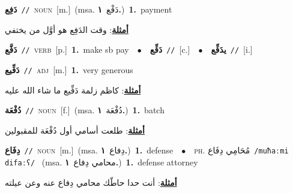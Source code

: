 \documentclass[10pt,a4paper,twoside]{article} %
\begin{document}
\begin{multicols}{2}
{\setlength\topsep{0pt}\textbf{\foreignlanguage{arabic}{دَفِع}}\ {\color{gray}\texttt{//}\color{black}}\ \textsc{noun}\ [m.]\ \color{gray}(msa. \foreignlanguage{arabic}{دَفْع}~\foreignlanguage{arabic}{\textbf{١.}})\color{black}\ \textbf{1.}~payment\  \begin{flushright}\color{gray}\foreignlanguage{arabic}{\textbf{\underline{\foreignlanguage{arabic}{أمثلة}}}: وقت الدَفِع هو أوَّل من يختفي}\end{flushright}\color{black}} \vspace{2mm}

{\setlength\topsep{0pt}\textbf{\foreignlanguage{arabic}{دَفَّع}}\ {\color{gray}\texttt{//}\color{black}}\ \textsc{verb}\ [p.]\ \textbf{1.}~make sb pay\ \ $\bullet$\ \ \setlength\topsep{0pt}\textbf{\foreignlanguage{arabic}{دَفِّع}}\ {\color{gray}\texttt{//}\color{black}}\ [c.]\ \ $\bullet$\ \ \setlength\topsep{0pt}\textbf{\foreignlanguage{arabic}{يدَفِّع}}\ {\color{gray}\texttt{//}\color{black}}\ [i.]\ } \vspace{2mm}

{\setlength\topsep{0pt}\textbf{\foreignlanguage{arabic}{دَفِّيع}}\ {\color{gray}\texttt{//}\color{black}}\ \textsc{adj}\ [m.]\ \textbf{1.}~very generous\  \begin{flushright}\color{gray}\foreignlanguage{arabic}{\textbf{\underline{\foreignlanguage{arabic}{أمثلة}}}: كاظم زلمة دَفِّيع ما شاء الله عليه}\end{flushright}\color{black}} \vspace{2mm}

{\setlength\topsep{0pt}\textbf{\foreignlanguage{arabic}{دُفْعَة}}\ {\color{gray}\texttt{//}\color{black}}\ \textsc{noun}\ [f.]\ \color{gray}(msa. \foreignlanguage{arabic}{دُفْعَة}~\foreignlanguage{arabic}{\textbf{١.}})\color{black}\ \textbf{1.}~batch\  \begin{flushright}\color{gray}\foreignlanguage{arabic}{\textbf{\underline{\foreignlanguage{arabic}{أمثلة}}}: طلعت أسامي أول دُفْعَة للمقبولين}\end{flushright}\color{black}} \vspace{2mm}

{\setlength\topsep{0pt}\textbf{\foreignlanguage{arabic}{دِفَاع}}\ {\color{gray}\texttt{//}\color{black}}\ \textsc{noun}\ [m.]\ \color{gray}(msa. \foreignlanguage{arabic}{دِفاع}~\foreignlanguage{arabic}{\textbf{١.}})\color{black}\ \textbf{1.}~defense\ \ $\bullet$\ \ \textsc{ph.} \color{gray} \foreignlanguage{arabic}{مُحَامِي دِفَاع}\color{black}\ {\color{gray}\texttt{/{\sffamily muħaːmi difaːʕ}/}\color{black}}\ \color{gray} (msa. \foreignlanguage{arabic}{محامي دِفاع}~\foreignlanguage{arabic}{\textbf{١.}})\color{black}\ \textbf{1.}~defense attorney\  \begin{flushright}\color{gray}\foreignlanguage{arabic}{\textbf{\underline{\foreignlanguage{arabic}{أمثلة}}}: أنت حدا حاطّك محامي دِفاع عنه وعن عيلته}\end{flushright}\color{black}} \vspace{2mm}


\end{multicols}
\end{document}
